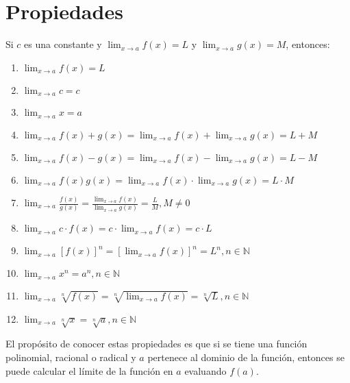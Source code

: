 \section{Propiedades}

 {
    Si $c$ es una constante y $\lim_{x \to a} f(x) = L$ y $\lim_{x \to a} g(x) = M$, entonces:

    \begin{enumerate}
        \item $\lim_{x \to a} f(x) = L$
        \item $\lim_{x \to a} c = c$
        \item $\lim_{x \to a} x = a$
        \item $\lim_{x \to a} f(x) + g(x) = \lim_{x \to a} f(x) + \lim_{x \to a} g(x) = L + M$
        \item $\lim_{x \to a} f(x) - g(x) = \lim_{x \to a} f(x) - \lim_{x \to a} g(x) = L - M$ 
        \item $\lim_{x \to a} f(x)g(x) = \lim_{x \to a} f(x) \cdot \lim_{x \to a} g(x) = L \cdot M$
        \item $\lim_{x \to a} \frac{f(x)}{g(x)} = \frac{\lim_{x \to a} f(x)}{\lim_{x \to a} g(x)} = \frac{L}{M}, M \neq 0$
        \item $\lim_{x \to a} c \cdot f(x) = c \cdot \lim_{x \to a} f(x) = c \cdot L$
        \item $\lim_{x \to a} [f(x)]^n = \left[\lim_{x \to a} f(x)\right]^n = L^n, n \in \mathbb{N}$
        \item $\lim_{x \to a} x^n = a^n, n \in \mathbb{N}$
        \item $\lim_{x \to a} \sqrt[n]{f(x)} = \sqrt[n]{\lim_{x \to a} f(x)} = \sqrt[n]{L}, n \in \mathbb{N}$
        \item $\lim_{x \to a} \sqrt[n]{x} = \sqrt[n]{a}, n \in \mathbb{N}$
    \end{enumerate}
}

El propósito de conocer estas propiedades es que si se tiene 
una función polinomial, racional o radical y $a$ pertenece al dominio de la función, 
entonces se puede calcular el límite de la función en $a$ evaluando $f(a)$. \\ 

